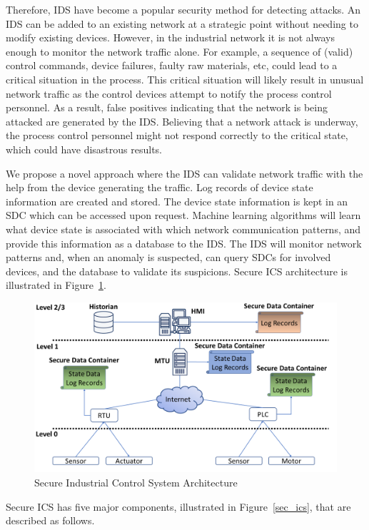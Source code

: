 \documentclass[conference]{IEEEtran}
\begin{document}
Therefore, IDS have become a popular security method for detecting attacks. An IDS can be added to an existing network at a strategic point without needing to modify existing devices.
However, in the industrial network it is not always enough to monitor the network traffic alone. For example, a sequence of (valid) control commands, device failures, faulty raw materials, etc, could lead to a critical situation in the process.  This critical situation will likely result in unusual network traffic as the control devices attempt to notify the process control personnel. As a result, false positives indicating that the network is being attacked are generated by the IDS.  Believing that a network attack is underway, the process control personnel might not respond correctly to the critical state, which could have disastrous results. 

We propose a novel approach where the IDS can validate network traffic with the help from the device generating the traffic. Log records of device state information are created and stored. The device state information is kept in an SDC which can be accessed upon request. Machine learning algorithms will learn what device state is associated with which network communication patterns, and provide this information as a database to the IDS. The IDS will monitor network patterns and, when an anomaly is suspected, can query SDCs for involved devices, and the database to validate its suspicions. Secure ICS architecture is illustrated in Figure~\ref{SICSA}. 

\begin{figure}[htbp]
\centering
\centerline{\includegraphics [width=.5\textwidth]{sec_arch.png}}
\caption{Secure Industrial Control System Architecture}
\label{SICSA}
\end{figure}

Secure ICS has five major components, illustrated in Figure~\ref{sec_ics}, that are described as follows.
\end{document}
